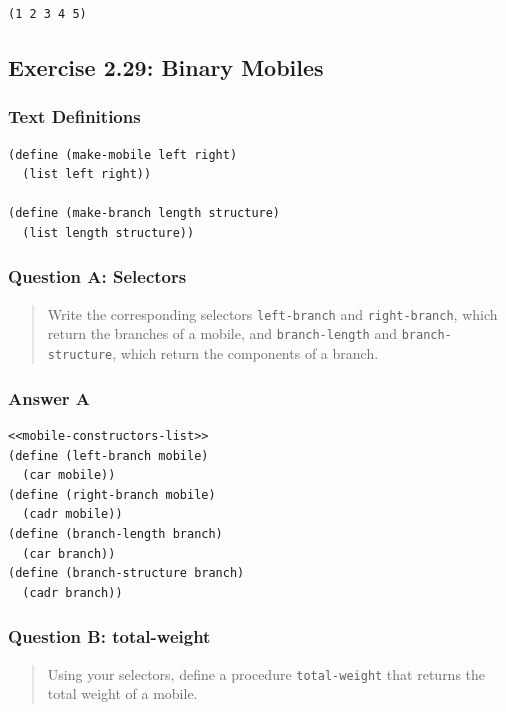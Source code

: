 \documentclass[final,fleqn,titlepage,twoside]{article}
\begin{document}
\begin{verbatim}
(1 2 3 4 5)
\end{verbatim}

\subsection{Exercise 2.29: Binary Mobiles}
\label{sec:orged53546}
\subsubsection{Text Definitions}
\label{sec:orgf37201c}
\begin{verbatim}
(define (make-mobile left right)
  (list left right))

(define (make-branch length structure)
  (list length structure))
\end{verbatim}

\subsubsection{Question A: Selectors}
\label{sec:org30e3129}
\begin{quote}
Write the corresponding selectors \texttt{left-branch} and
\texttt{right-branch}, which return the branches of a mobile, and
\texttt{branch-length} and \texttt{branch-structure}, which return the
components of a branch.
\end{quote}

\subsubsection{Answer A}
\label{sec:orge81126e}
\begin{verbatim}
<<mobile-constructors-list>>
(define (left-branch mobile)
  (car mobile))
(define (right-branch mobile)
  (cadr mobile))
(define (branch-length branch)
  (car branch))
(define (branch-structure branch)
  (cadr branch))
\end{verbatim}

\subsubsection{Question B: total-weight}
\label{sec:orgdc1fd12}
\begin{quote}
Using your selectors, define a procedure \texttt{total-weight} that returns
the total weight of a mobile.
\end{quote}
\end{document}

